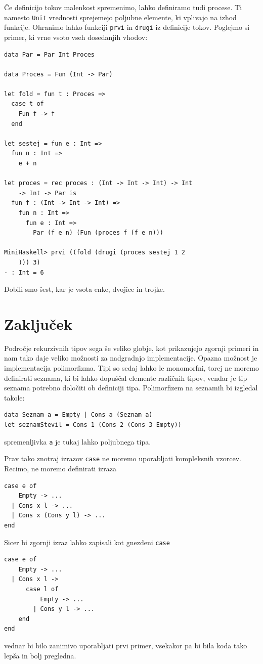 \documentclass[a4paper,12pt,openright]{book}
\begin{document}
Če definicijo tokov malenkost spremenimo, lahko definiramo tudi procese. Ti namesto \lstinline{Unit} vrednosti sprejemejo poljubne elemente, ki 
vplivajo na izhod funkcije. Ohranimo lahko funkciji \lstinline{prvi} in \lstinline{drugi} iz definicije tokov. Poglejmo si primer, ki vrne vsoto 
vseh dosedanjih vhodov:
\begin{lstlisting}
data Par = Par Int Proces

data Proces = Fun (Int -> Par)

let fold = fun t : Proces =>
  case t of
    Fun f -> f
  end

let sestej = fun e : Int =>
  fun n : Int =>
    e + n

let proces = rec proces : (Int -> Int -> Int) -> Int 
    -> Int -> Par is
  fun f : (Int -> Int -> Int) =>
    fun n : Int =>
      fun e : Int =>
        Par (f e n) (Fun (proces f (f e n)))
  
MiniHaskell> prvi ((fold (drugi (proces sestej 1 2
    ))) 3)
- : Int = 6
\end{lstlisting}
Dobili smo šest, kar je vsota enke, dvojice in trojke.


\chapter{Zaključek}
Področje rekurzivnih tipov sega še veliko globje, kot prikazujejo zgornji primeri in nam tako daje veliko možnosti za nadgradnjo implementacije. 
Opazna možnost je implementacija polimorfizma. Tipi so sedaj lahko le monomorfni, torej ne moremo definirati seznama, ki bi lahko dopuščal elemente različnih tipov, 
vendar je tip seznama potrebno določiti ob definiciji tipa. Polimorfizem na seznamih bi izgledal takole:
\begin{lstlisting}
data Seznam a = Empty | Cons a (Seznam a)
let seznamStevil = Cons 1 (Cons 2 (Cons 3 Empty))
\end{lstlisting}
spremenljivka \lstinline{a} je tukaj lahko poljubnega tipa.

Prav tako znotraj izrazov \lstinline{case} ne moremo uporabljati kompleksnih vzorcev. Recimo, ne moremo definirati izraza
\begin{lstlisting}
case e of
    Empty -> ...
  | Cons x l -> ...
  | Cons x (Cons y l) -> ...
end
\end{lstlisting}
Sicer bi zgornji izraz lahko zapisali kot gnezdeni \lstinline{case}
\begin{lstlisting}
case e of
    Empty -> ...
  | Cons x l ->
      case l of
          Empty -> ...
        | Cons y l -> ...
    end
end
\end{lstlisting}
vednar bi bilo zanimivo uporabljati prvi primer, vsekakor pa bi bila koda tako lepša in bolj pregledna.
\end{document}
